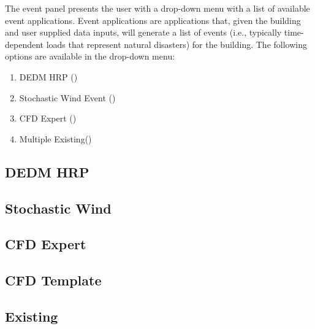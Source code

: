 The event panel presents the user with a drop-down menu with a list of
available event applications. Event applications are applications
that, given the building and user supplied data inputs, will generate
a list of events (i.e., typically time-dependent loads that represent natural disasters) for the building. The following options
are available in the drop-down menu:

\begin{enumerate}
\item DEDM HRP ()
\item Stochastic Wind Event ()
\item CFD Expert ()
\item Multiple Existing()
\end{enumerate}

\subsection{DEDM HRP}
\label{subsec:dedm_hrp}


\subsection{Stochastic Wind}
\label{subsec:stochastic_wind}


\subsection{CFD Expert}
\label{subsec:cfd_expert}


\subsection{CFD Template}
\label{subsec:cfd_template}


\subsection{Existing}
\label{subsec:multiple_existing}

